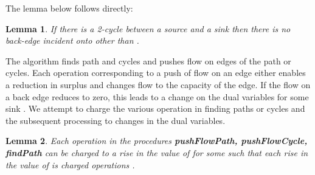 \documentclass[11pt]{article}
\newtheorem{lemma}{Lemma}[section]
\newcounter{rem}
\begin{document}
The lemma below follows directly:
\begin{lemma} 
\label{lemma_oneloop}
If there is a 2-cycle between a source  and a sink  then there
is no back-edge incident onto   other than .
\end{lemma}
The algorithm finds path and cycles and pushes flow on edges
of the path or cycles. Each operation corresponding to a 
push of flow on an edge either enables a reduction
in surplus and changes flow to the capacity of the edge. 
If the flow on a back edge reduces to zero, this  leads to
a change on the dual variables  for some sink . 
We attempt to charge the various operation in finding paths or cycles and the
subsequent processing to changes in the dual variables.
\begin{lemma}
Each operation in the  procedures  {\bf pushFlowPath, pushFlowCycle, findPath}
can be charged to a rise in the value of  for some 
such that each rise in the value of  is charged  operations .
\label{lemma_charge}
\end{lemma}
\end{document}
